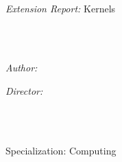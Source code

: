 \documentclass[
11pt, %
oneside, %
english, %
singlespacing, %
headsepline, %
table,
]{MastersDoctoralThesis} %
\author{Robert \textsc{Planas}} %
\begin{document}
\frontmatter %

\pagestyle{plain} %


\begin{titlepage}
\begin{center}

\vspace*{.06\textheight}
{\scshape\LARGE \univname\par}\vspace{0.5cm} %
\textsc{\Large \facname}\\[1.5cm] %
\Large{\emph{Extension Report:} Kernels}\\[0.5cm] %

\HRule \\[0.4cm] %
{\huge \bfseries \ttitle\par}\vspace{0.4cm} %
\HRule \\[1.5cm] %
 
\begin{minipage}[t]{0.4\textwidth}
\begin{flushleft} \large
\emph{Author:}\\
\href{http://www.hubbit86.com}{\authorname} %
\end{flushleft}
\end{minipage}
\begin{minipage}[t]{0.4\textwidth}
\begin{flushright} \large
\emph{Director:} \\
\href{https://www.cs.upc.edu/~belanche/}{\supname} %
\end{flushright}
\end{minipage}\\[4cm]

\vfill

\large \degreename\\ %
\large Specialization:  Computing\\[0.5cm] %


\end{center}
\end{titlepage}
\end{document}
